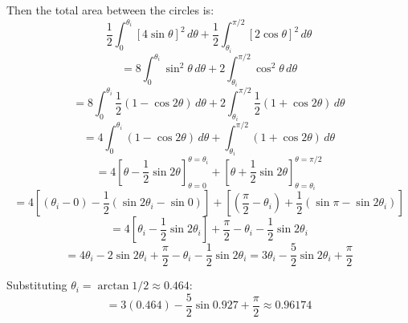 \begin{Answer}[ref = polar5]
Then the total area between the circles is:
$$\frac{1}{2} \int_{0}^{\theta_i} \left[ 4\sin{\theta} \right]^2 \, d\theta + 
\frac{1}{2} \int_{\theta_i}^{\pi / 2} \left[ 2\cos{\theta} \right]^2 \, d
\theta$$
$$= 8 \int_{0}^{\theta_i} \sin^2{\theta} \, d\theta + 2 \int_{\theta_i}^{\pi / 
2} \cos^2{\theta} \, d\theta$$
$$= 8 \int_{0}^{\theta_i} \frac{1}{2} \left( 1 - \cos{2\theta} \right) \, d
\theta + 2 \int_{\theta_i}^{\pi / 2} \frac{1}{2} \left( 1 + \cos{2\theta} 
\right) \, d\theta$$
$$=4 \int_{0}^{\theta_i} \left( 1 - \cos{2\theta} \right) \, d\theta + \int_{
\theta_i}^{\pi / 2} \left( 1 + \cos{2\theta} \right) \, d\theta$$
$$= 4 \left[ \theta - \frac{1}{2} \sin{2\theta} \right]_{\theta = 0}^{\theta = 
\theta_i} + \left[ \theta + \frac{1}{2} \sin{2\theta} \right]_{\theta = \theta_
i}^{\theta = \pi / 2}$$
$$= 4 \left[ \left( \theta_i - 0 \right) - \frac{1}{2} \left( \sin{2\theta_i} -
\sin{0} \right) \right] + \left[ \left( \frac{\pi}{2} - \theta_i \right) + 
\frac{1}{2} \left( \sin{\pi} - \sin{2\theta_i} \right) \right]$$
$$= 4\left[ \theta_i - \frac{1}{2}\sin{2\theta_i} \right] + \frac{\pi}{2} - 
\theta_i - \frac{1}{2}\sin{2\theta_i}$$
$$= 4\theta_i - 2\sin{2\theta_i} + \frac{\pi}{2} - \theta_i - \frac{1}{2}\sin{
2\theta_i} = 3\theta_i - \frac{5}{2}\sin{2\theta_i} + \frac{\pi}{2}$$

Substituting $\theta_i = \arctan{1 / 2} \approx 0.464$:
$$= 3 (0.464) - \frac{5}{2}\sin{0.927} + \frac{\pi}{2} \approx 0.96174$$
\end{Answer}